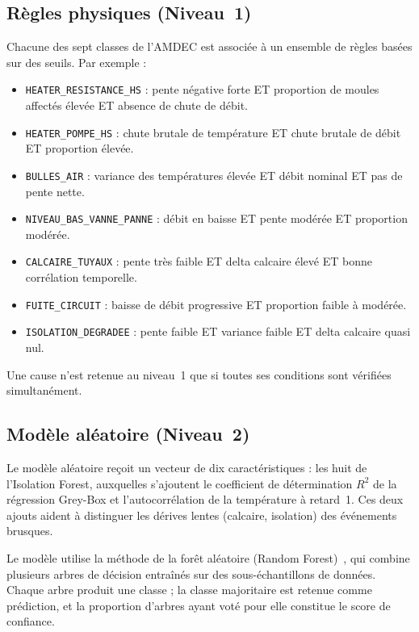 \subsection{Règles physiques (Niveau~1)}

Chacune des sept classes de l'AMDEC est associée à un ensemble de règles basées sur des seuils. Par exemple :

\begin{itemize}
  \item \texttt{HEATER\_RESISTANCE\_HS} : pente négative forte ET proportion de moules affectés élevée ET absence de chute de débit.
  \item \texttt{HEATER\_POMPE\_HS} : chute brutale de température ET chute brutale de débit ET proportion élevée.
  \item \texttt{BULLES\_AIR} : variance des températures élevée ET débit nominal ET pas de pente nette.
  \item \texttt{NIVEAU\_BAS\_VANNE\_PANNE} : débit en baisse ET pente modérée ET proportion modérée.
  \item \texttt{CALCAIRE\_TUYAUX} : pente très faible ET delta calcaire élevé ET bonne corrélation temporelle.
  \item \texttt{FUITE\_CIRCUIT} : baisse de débit progressive ET proportion faible à modérée.
  \item \texttt{ISOLATION\_DEGRADEE} : pente faible ET variance faible ET delta calcaire quasi nul.
\end{itemize}

Une cause n'est retenue au niveau~1 que si toutes ses conditions sont vérifiées simultanément.

\subsection{Modèle aléatoire (Niveau~2)}

Le modèle aléatoire reçoit un vecteur de dix caractéristiques : les huit de l'Isolation Forest, auxquelles s'ajoutent le coefficient de détermination \(R^2\) de la régression Grey-Box et l'autocorrélation de la température à retard~1. Ces deux ajouts aident à distinguer les dérives lentes (calcaire, isolation) des événements brusques.

Le modèle utilise la méthode de la forêt aléatoire (Random Forest)~\cite{bib32}, qui combine plusieurs arbres de décision entraînés sur des sous-échantillons de données. Chaque arbre produit une classe ; la classe majoritaire est retenue comme prédiction, et la proportion d'arbres ayant voté pour elle constitue le score de confiance.

